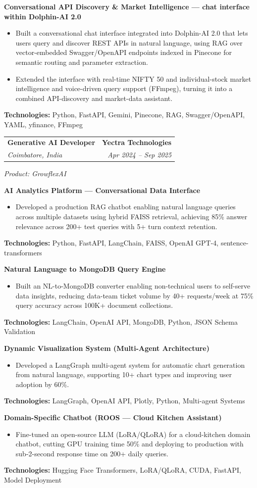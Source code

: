 \documentclass[11pt, letterpaper]{article}
\makeatletter
\newcommand{\jobheading}[4]{%
    \noindent\begin{tabularx}{\textwidth}{@{}X r@{}}
        \fontsize{12}{14}\selectfont\textbf{#1} & \fontsize{12}{14}\selectfont\textbf{#2} \\
        \fontsize{11}{13}\selectfont\textit{#3} & \fontsize{11}{13}\selectfont\textit{#4}
    \end{tabularx}\vspace{2pt}
}
\newcommand{\projectheading}[1]{%
    \vspace{5pt}
    \noindent\fontsize{11}{13}\selectfont\textbf{#1}
    \vspace{3pt}
}
\newcommand{\bulletpoints}[1]{%
    \begin{itemize}[leftmargin=1.4em, itemsep=2pt, topsep=2pt]
        #1
    \end{itemize}
    \vspace{2pt}
}
\newcommand{\bulletitem}[1]{%
    \item \fontsize{11}{12}\selectfont #1
}
\newcommand{\techline}[1]{%
    \noindent\fontsize{10}{12}\selectfont\textbf{Technologies:} #1
    \vspace{4pt}
}
\makeatother
\begin{document}
\projectheading{Conversational API Discovery \& Market Intelligence --- chat interface within Dolphin-AI 2.0}
\bulletpoints{
\bulletitem{Built a conversational chat interface integrated into Dolphin-AI 2.0 that lets users query and discover REST APIs in natural language, using RAG over vector-embedded Swagger/OpenAPI endpoints indexed in Pinecone for semantic routing and parameter extraction.}
\bulletitem{Extended the interface with real-time NIFTY 50 and individual-stock market intelligence and voice-driven query support (FFmpeg), turning it into a combined API-discovery and market-data assistant.}
}
\techline{Python, FastAPI, Gemini, Pinecone, RAG, Swagger/OpenAPI, YAML, yfinance, FFmpeg}



\jobheading{Generative AI Developer}{Yectra Technologies}{Coimbatore, India}{Apr 2024 -- Sep 2025}
\noindent\fontsize{11}{13}\selectfont\textit{Product: GrowflexAI}\vspace{4pt}

\projectheading{AI Analytics Platform --- Conversational Data Interface}
\bulletpoints{
\bulletitem{Developed a production RAG chatbot enabling natural language queries across multiple datasets using hybrid FAISS retrieval, achieving 85\% answer relevance across 200+ test queries with 5+ turn context retention.}
}
\techline{Python, FastAPI, LangChain, FAISS, OpenAI GPT-4, sentence-transformers}

\projectheading{Natural Language to MongoDB Query Engine}
\bulletpoints{
\bulletitem{Built an NL-to-MongoDB converter enabling non-technical users to self-serve data insights, reducing data-team ticket volume by 40+ requests/week at 75\% query accuracy across 100K+ document collections.}
}
\techline{LangChain, OpenAI API, MongoDB, Python, JSON Schema Validation}

\projectheading{Dynamic Visualization System (Multi-Agent Architecture)}
\bulletpoints{
\bulletitem{Developed a LangGraph multi-agent system for automatic chart generation from natural language, supporting 10+ chart types and improving user adoption by 60\%.}
}
\techline{LangGraph, OpenAI API, Plotly, Python, Multi-agent Systems}

\projectheading{Domain-Specific Chatbot (ROOS --- Cloud Kitchen Assistant)}
\bulletpoints{
\bulletitem{Fine-tuned an open-source LLM (LoRA/QLoRA) for a cloud-kitchen domain chatbot, cutting GPU training time 50\% and deploying to production with sub-2-second response time on 200+ daily queries.}
}
\techline{Hugging Face Transformers, LoRA/QLoRA, CUDA, FastAPI, Model Deployment}
\end{document}
